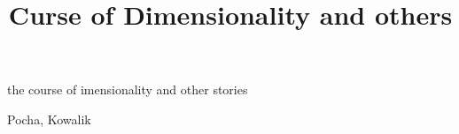 \documentclass{beamer}
\title[SemAI 1]{Curse of Dimensionality and others}
\begin{document}
the course of imensionality and other stories

Pocha, Kowalik
\end{document}
